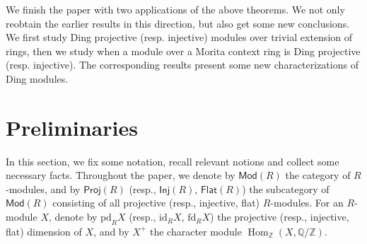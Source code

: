 \documentclass[10pt,twoside]{amsart}
\theoremstyle{bfupright head,slanted body}
\theoremstyle{bfupright head,upright body}
\theoremstyle{fixed bf head,slanted body}
\theoremstyle{fixed bf head,upright body}
\theoremstyle{numbered paragraph}
\numberwithin{equation}{res}
\newcommand{\Proj}{\mathsf{Proj}}
\newcommand{\id}{\mathrm{id}}
\newcommand{\fd}{\mathrm{fd}}
\newcommand{\pd}{\mathrm{pd}}
\newcommand{\Inj}{\mathsf{Inj}}
\newcommand{\Flat}{\mathsf{Flat}}
\newcommand{\Mod}{\mathsf{Mod}}
\newcommand{\Hom}{\operatorname{Hom}}
\begin{document}
We finish the paper with two applications of the above theorems.
We not only reobtain the earlier results in this direction,
but also get some new conclusions.
We first study Ding projective (resp. injective)
modules over trivial extension of rings, 
then we study when a module over a Morita context ring is Ding projective (resp. injective).
The corresponding results present some new characterizations of Ding modules.

\section{Preliminaries}
\label{Preliminaries}%
\noindent
In this section, we fix some notation, recall relevant notions
and collect some necessary facts.
Throughout the paper, we denote by $\Mod(R)$ the category of $R$-modules,
and by $\Proj(R)$ (resp., $\Inj(R)$, $\Flat(R)$) the subcategory of $\Mod(R)$
consisting of all projective (resp., injective, flat) $R$-modules. 
For an $R$-module $X$, denote by $\pd_{R}X$ (resp., $\id_{R}X$, $\fd_{R}X$)
the projective (resp., injective, flat) dimension of $X$, and
by $X^+$ the character module $\Hom_\mathbb{Z}(X, \mathbb{Q/Z})$.
\end{document}

